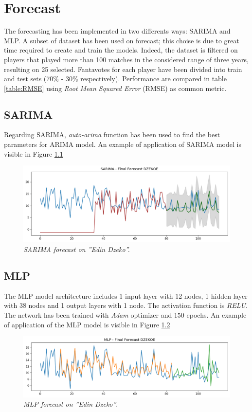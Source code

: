 \chapter {Forecast}

The forecasting has been implemented in two differents ways: SARIMA and MLP.
A subset of dataset has been used on forecast; this choise is due to great time required to create and train the models.
Indeed, the dataset is filtered on players that played more than 100 matches in the considered range of three years, resulting on 25 selected.
Fantavotes for each player have been divided into train and test sets (70\% - 30\% respectively).
Performance are compared in table \ref{table:RMSE} using \textit{Root Mean Squared Error} (RMSE) as common metric.

\section{SARIMA}

Regarding SARIMA, \textit{auto-arima} function has been used to find the best parameters for ARIMA model.
An example of application of SARIMA model is visible in Figure \ref{fig:sarima}

\begin{figure}[H]
  \includegraphics[scale=0.5]{images/dzeko_sarima_fantavoti.png}
   \caption{\textit{SARIMA forecast on ''Edin Dzeko''.}}
  \label{fig:sarima}
\end{figure}

\section{MLP}
The MLP model architecture includes 1 input layer with 12 nodes, 1 hidden layer with 38 nodes and 1 output layers with 1 node. The activation function is \textit{RELU}.
The network has been trained with \textit{Adam} optimizer and 150 epochs.
An example of application of the MLP model is visible in Figure \ref{fig:mlp}
\begin{figure}[H]
  \includegraphics[scale=0.5]{images/dzeko_mlp_fantavoti.png}
   \caption{\textit{MLP forecast on ''Edin Dzeko''.}}
  \label{fig:mlp}
\end{figure}

